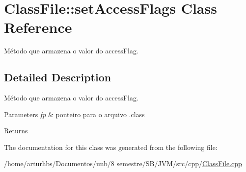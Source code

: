 \hypertarget{classClassFile_1_1setAccessFlags}{}\section{Class\+File\+:\+:set\+Access\+Flags Class Reference}
\label{classClassFile_1_1setAccessFlags}


Método que armazena o valor do access\+Flag.  




\subsection{Detailed Description}
Método que armazena o valor do access\+Flag. 


\begin{DoxyParams}{Parameters}
{\em fp} & ponteiro para o arquivo .class \\
\hline
\end{DoxyParams}
\begin{DoxyReturn}{Returns}

\end{DoxyReturn}


The documentation for this class was generated from the following file\+:\begin{DoxyCompactItemize}
\item 
/home/arturhbs/\+Documentos/unb/8 semestre/\+S\+B/\+J\+V\+M/src/cpp/\hyperlink{ClassFile_8cpp}{Class\+File.\+cpp}\end{DoxyCompactItemize}

